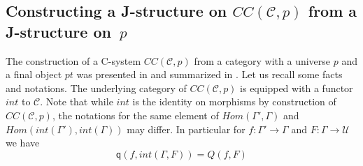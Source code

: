 \documentclass[12pt]{article}
\numberwithin{equation}{section}
\newenvironment{eq}{\begin{equation}}{\end{equation}}
\newcommand{\llabel}[1]{\label{#1}}
\newcommand{\sr}{\rightarrow}
\newcommand{\toCC}{CC} %
\newcommand{\q}{\mathsf{q}}
\newcommand{\U}{\mathcal{U}}
\begin{document}
\subsection{Constructing a J-structure on $\toCC({\mathcal C},p)$ from a J-structure on~$p$}
%
The construction of a C-system $\toCC({\mathcal C},p)$ from a category with a
universe $p$ and a final object $pt$ was presented in \cite{Cfromauniverse} and
summarized in \cite{fromunivwithPi}. Let us recall some facts and
notations. The underlying category of $\toCC({\mathcal C},p)$ is equipped with a
functor $int$ to $\mathcal C$. Note that while $int$ is the identity on
morphisms by construction of $\toCC({\mathcal C},p)$, the notations for the same
element of $Hom(\Gamma',\Gamma)$ and $Hom(int(\Gamma'),int(\Gamma))$ may
differ. In particular for $f:\Gamma'\sr \Gamma$ and $F:\Gamma\sr \U$ we have
%
\begin{eq}
\llabel{2015.04.02.eq2} \q(f,int(\Gamma,F))=Q(f,F)
\end{eq}
%
\end{document}
